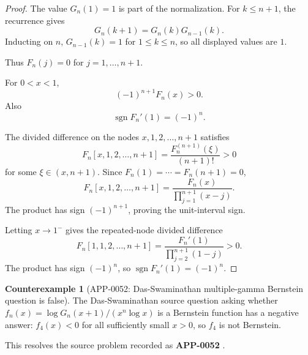 \documentclass[11pt]{article}
\numberwithin{equation}{section}
\theoremstyle{definition}
\newtheorem{counterexample}[theorem]{Counterexample}
\theoremstyle{remark}
\newcommand{\1}{\mathbf 1}
\begin{document}
\begin{proof}
The value \(G_n(1)=1\) is part of the normalization. For \(k\le n+1\), the recurrence gives
\[
G_n(k+1)=G_n(k)G_{n-1}(k).
\]
Inducting on \(n\), \(G_{n-1}(k)=1\) for \(1\le k\le n\), so all displayed values are \(1\).

Thus \(F_n(j)=0\) for \(j=1,\dots,n+1\).

For \(0<x<1\),
\[
(-1)^{n+1}F_n(x)>0.
\]
Also
\[
\operatorname{sgn} F_n'(1)=(-1)^n.
\]

The divided difference on the nodes \(x,1,2,\dots,n+1\) satisfies
\[
F_n[x,1,2,\dots,n+1]
=\frac{F_n^{(n+1)}(\xi)}{(n+1)!}>0
\]
for some \(\xi\in(x,n+1)\). Since \(F_n(1)=\cdots=F_n(n+1)=0\),
\[
F_n[x,1,2,\dots,n+1]
=\frac{F_n(x)}{\prod_{j=1}^{n+1}(x-j)}.
\]
The product has sign \((-1)^{n+1}\), proving the unit-interval sign.

Letting \(x\to1^-\) gives the repeated-node divided difference
\[
F_n[1,1,2,\dots,n+1]
=\frac{F_n'(1)}{\prod_{j=2}^{n+1}(1-j)}>0.
\]
The product has sign \((-1)^n\), so \(\operatorname{sgn}F_n'(1)=(-1)^n\).
\end{proof}

\begin{counterexample}[APP-0052: Das-Swaminathan multiple-gamma Bernstein question is false]
\label{res:not-dasswaminathan-fn-bernstein-all-n}
The Das-Swaminathan source question asking whether \(f_n(x)=\log G_n(x+1)/(x^n\log x)\) is a Bernstein function has a negative answer: \(f_4(x)<0\) for all sufficiently small \(x>0\), so \(f_4\) is not Bernstein.



This resolves the source problem recorded as \textbf{APP-0052} \cite{app-app-0052-source}.
\end{counterexample}
\end{document}
